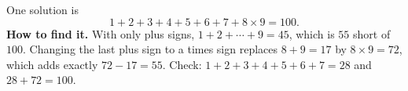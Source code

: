 One solution is
\[\boxed{1+2+3+4+5+6+7+8\times9=100}.\]
\textbf{How to find it.} With only plus signs, $1+2+\cdots+9=45$, which is $55$ short of $100$. Changing the last plus sign to a times sign replaces $8+9=17$ by $8\times9=72$, which adds exactly $72-17=55$. Check: $1+2+3+4+5+6+7=28$ and $28+72=100$.
